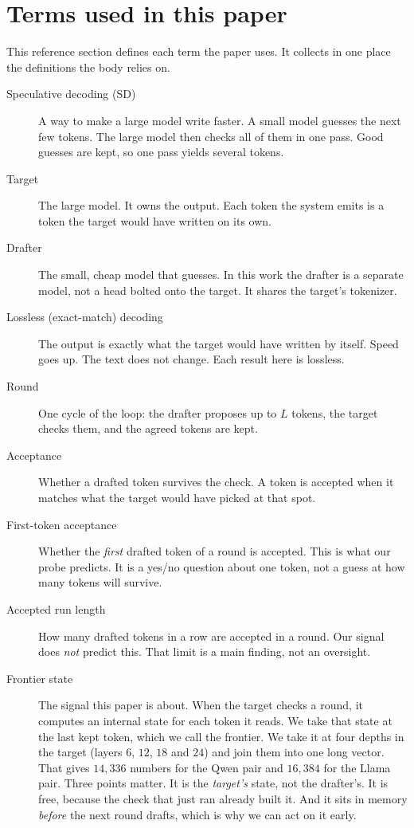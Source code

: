 \documentclass[11pt]{article}
\begin{document}
\section{Terms used in this paper}
\label{sec:terms}

This reference section defines each term the paper uses. It collects in one
place the definitions the body relies on.

\begin{description}

\item[Speculative decoding (SD)] A way to make a large model write faster. A
small model guesses the next few tokens. The large model then checks all of
them in one pass. Good guesses are kept, so one pass yields several tokens.

\item[Target] The large model. It owns the output. Each token the system
emits is a token the target would have written on its own.

\item[Drafter] The small, cheap model that guesses. In this work the drafter is
a separate model, not a head bolted onto the target. It shares the target's
tokenizer.

\item[Lossless (exact-match) decoding] The output is exactly what the target
would have written by itself. Speed goes up. The text does not change. Each
result here is lossless.

\item[Round] One cycle of the loop: the drafter proposes up to $L$ tokens, the
target checks them, and the agreed tokens are kept.

\item[Acceptance] Whether a drafted token survives the check. A token is
accepted when it matches what the target would have picked at that spot.

\item[First-token acceptance] Whether the \emph{first} drafted token of a round
is accepted. This is what our probe predicts. It is a yes/no question about one
token, not a guess at how many tokens will survive.

\item[Accepted run length] How many drafted tokens in a row are accepted in a
round. Our signal does \emph{not} predict this. That limit is a main finding,
not an oversight.

\item[Frontier state] The signal this paper is about. When the target checks a
round, it computes an internal state for each token it reads. We take that
state at the last kept token, which we call the frontier. We take it at
four depths in the target (layers $6$, $12$, $18$ and $24$) and join them into
one long vector. That gives $14{,}336$ numbers for the Qwen pair and
$16{,}384$ for the Llama pair. Three points matter. It is the \emph{target's}
state, not the drafter's. It is free, because the check that just ran already
built it. And it sits in memory \emph{before} the next round drafts, which
is why we can act on it early.


\end{description}
\end{document}
